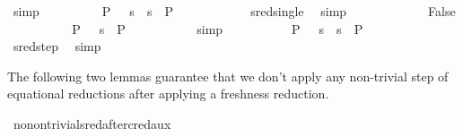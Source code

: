 \begin{isabellebody}
\ simp\isanewline
\ \ \ \ \ \ \isamarkupfalse%
\ \isamarkupfalse%
\ {\isachardoublequoteopen}P{}\ {\isasymTurnstile}\ {\isacharparenleft}{\kern0pt}{\isacharbraceleft}{\kern0pt}{\isacharbraceright}{\kern0pt}{\isacharcomma}{\kern0pt}\ s{}\ {\isasymbullet}\ s{}{\isacharparenright}{\kern0pt}\ {\isasymRightarrow}\ P{}\ {\isachardoublequoteclose}\ \isanewline
\ \ \ \ \ \ \ \ \isamarkupfalse%
\ sred{\isacharunderscore}{\kern0pt}single\ \isamarkupfalse%
\ simp\isanewline
\ \ \ \ \isamarkupfalse%
\isanewline
\ \ \ \ \ \ \isamarkupfalse%
\ False\isanewline
\ \ \ \ \ \ \isamarkupfalse%
\ {}{\isacharparenleft}{\kern0pt}{}{\isacharcomma}{\kern0pt}{}{\isacharparenright}{\kern0pt}\ \isamarkupfalse%
\ {\isachardoublequoteopen}P{\isacharprime}{\kern0pt}\ {\isasymTurnstile}\ {\isacharparenleft}{\kern0pt}{\isacharbraceleft}{\kern0pt}{\isacharbraceright}{\kern0pt}{\isacharcomma}{\kern0pt}\ s{}{\isacharparenright}{\kern0pt}\ {\isasymRightarrow}\ P{}{\isachardoublequoteclose}\ \isanewline
\ \ \ \ \ \ \ \ \isamarkupfalse%
\ simp\isanewline
\ \ \ \ \ \ \isamarkupfalse%
\ {}{\isacharparenleft}{\kern0pt}{}{\isacharparenright}{\kern0pt}\ \isamarkupfalse%
\ {\isachardoublequoteopen}P{}\ {\isasymTurnstile}\ {\isacharparenleft}{\kern0pt}{\isacharbraceleft}{\kern0pt}{\isacharbraceright}{\kern0pt}{\isacharcomma}{\kern0pt}\ s{}\ {\isasymbullet}\ s{}{\isacharparenright}{\kern0pt}\ {\isasymRightarrow}\ P{}{\isachardoublequoteclose}\ \isanewline
\ \ \ \ \ \ \ \ \isamarkupfalse%
\ sred{\isacharunderscore}{\kern0pt}step\ \isamarkupfalse%
\ simp\isanewline
\ \ \ \ \isamarkupfalse%
\isanewline
{}\isamarkupfalse%
%
\endisatagproof
{\isafoldproof}%
%
\isadelimproof
%
\endisadelimproof
%
\begin{isamarkuptext}%
The following two lemmas guarantee that we don't apply any non-trivial step of equational
reductions after applying a freshness reduction.%
\end{isamarkuptext}\isamarkuptrue%
\isamarkupfalse%
\ no{\isacharunderscore}{\kern0pt}nontrivial{\isacharunderscore}{\kern0pt}sred{\isacharunderscore}{\kern0pt}after{\isacharunderscore}{\kern0pt}cred{\isacharunderscore}{\kern0pt}aux{\isacharcolon}{\kern0pt}\isanewline

\end{isabellebody}
